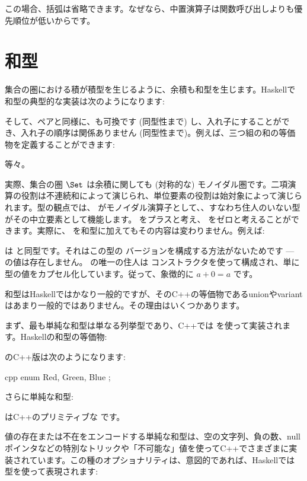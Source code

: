 この場合、括弧は省略できます。なぜなら、中置演算子は関数呼び出しよりも優先順位が低いからです。

\section{和型}

集合の圏における積が積型を生じるように、余積も和型を生じます。Haskellで和型の典型的な実装は次のようになります: 

そして、ペアと同様に、も可換です (同型性まで) し、入れ子にすることができ、入れ子の順序は関係ありません (同型性まで)。例えば、三つ組の和の等価物を定義することができます: 

等々。

実際、集合の圏 $\Set$ は余積に関しても (対称的な) モノイダル圏です。二項演算の役割は不連続和によって演じられ、単位要素の役割は始対象によって演じられます。型の観点では、 がモノイダル演算子として、、すなわち住人のいない型がその中立要素として機能します。 をプラスと考え、 をゼロと考えることができます。実際に、 を和型に加えてもその内容は変わりません。例えば: 

は  と同型です。それはこの型の  バージョンを構成する方法がないためです ---  の値は存在しません。  の唯一の住人は  コンストラクタを使って構成され、単に  型の値をカプセル化しています。従って、象徴的に $a + 0 = a$ です。

和型はHaskellではかなり一般的ですが、そのC++の等価物であるunionやvariantはあまり一般的ではありません。その理由はいくつかあります。

まず、最も単純な和型は単なる列挙型であり、C++では  を使って実装されます。Haskellの和型の等価物: 

のC++版は次のようになります: 

\begin{snip}{cpp}
enum { Red, Green, Blue };
\end{snip}
さらに単純な和型: 

はC++のプリミティブな  です。

値の存在または不在をエンコードする単純な和型は、空の文字列、負の数、nullポインタなどの特別なトリックや「不可能な」値を使ってC++でさまざまに実装されています。この種のオプショナリティは、意図的であれば、Haskellでは  型を使って表現されます: 

